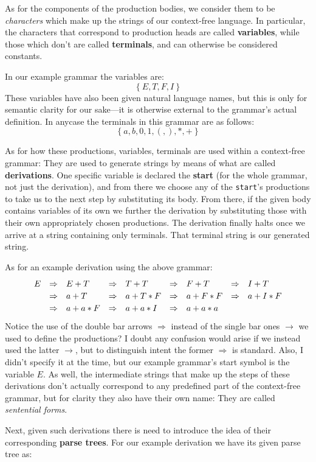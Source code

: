 \documentclass[twoside]{article}
\newcommand{\RA}{\Rightarrow}
\newcommand{\strong}[1]{{\bfseries #1}}
\begin{document}
As for the components of the production bodies, we consider them to be \emph{characters} which make up the strings of our
context-free language. In particular, the characters that correspond to production heads are called \strong{variables},
while those which don't are called \strong{terminals}, and can otherwise be considered constants.

In our example grammar the variables are:
$$ \{\ E, T, F, I\ \} $$
These variables have also been given natural language names, but this is only for semantic clarity for our sake---it
is otherwise external to the grammar's actual definition. In anycase the terminals in this grammar are as follows:
$$ \{\ a, b, 0, 1, (, ), *, +\ \} $$

As for how these productions, variables, terminals are used within a context-free grammar: They are used to generate
strings by means of what are called \strong{derivations}. One specific variable is declared the \strong{start} (for the whole
grammar, not just the derivation), and from there we choose any of the \texttt{start}'s productions to take us to the next
step by substituting its body. From there, if the given body contains variables of its own we further the derivation by
substituting those with their own appropriately chosen productions. The derivation finally halts once we arrive
at a string containing only terminals. That terminal string is our generated string.

As for an example derivation using the above grammar:
$$ \def\arraystretch{1.2}
\begin{array}{rclllllll}
E & \RA & E+T	& \RA & T+T	& \RA & F+T	& \RA & I+T		\\
  & \RA & a+T	& \RA & a+T*F	& \RA & a+F*F	& \RA & a+I*F		\\
  & \RA & a+a*F	& \RA & a+a*I	& \RA & a+a*a
\end{array} $$
Notice the use of the double bar arrows $ \RA $ instead of the single bar ones $ \to $ we used to define the productions?
I doubt any confusion would arise if we instead used the latter $ \to $, but to distinguish intent the former $ \RA $
is standard. Also, I didn't specify it at the time, but our example grammar's start symbol is the variable $ E $.
As well, the intermediate strings that make up the steps of these derivations don't actually correspond to any
predefined part of the context-free grammar, but for clarity they also have their own name: They are called
\emph{sentential forms}.

Next, given such derivations there is need to introduce the idea of their corresponding \strong{parse trees}.
For our example derivation we have its given parse tree as:
\end{document}
